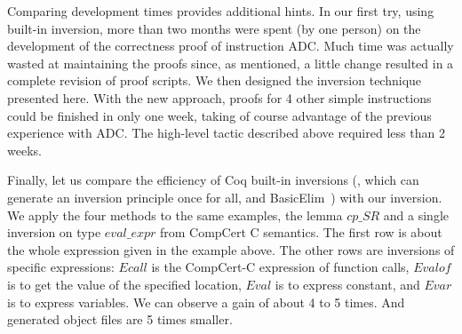 Comparing development times provides additional hints.  
In our first try, using built-in inversion,
more than two months were spent (by one person) on the development of 
the correctness proof of instruction ADC.
Much time was actually wasted at maintaining the proofs since,
as mentioned, a little change resulted in 
a complete revision of proof scripts. 
We then designed the inversion technique presented here.
With the new approach, proofs for 4 other simple instructions 
could be finished in only one week, 
taking of course advantage of the previous experience with ADC.
The high-level tactic described above required less than 2 weeks.

Finally, let us compare the efficiency of Coq built-in inversions 
(\inversion, 
\derive \inversion which can generate an inversion principle once for all, 
and BasicElim~\cite{mcbride00}) with our inversion.
We apply the four methods to the same examples, the lemma $cp\_SR$ and
a single inversion on type $eval\_expr$ from CompCert C semantics.
The first row is about the whole expression given in the example above. 
The other rows are inversions of specific expressions: 
$Ecall$ is the CompCert-C expression of function calls, 
$Evalof$ is to get the value of the specified location, 
$Eval$ is to express constant, and $Evar$ is to express variables.  
We can observe a gain of about 4 to 5 times.
And generated object files are 5 times smaller.




